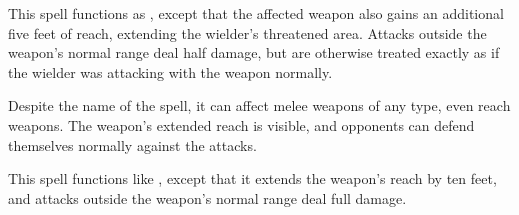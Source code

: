 \spelldur{\durshort}
\begin{spelleffect}
    This spell functions as , except that the affected weapon also gains an additional five feet of reach, extending the wielder's threatened area. Attacks outside the weapon's normal range deal half damage, but are otherwise treated exactly as if the wielder was attacking with the weapon normally.
\end{spelleffect}
\begin{spellnotes}
    Despite the name of the spell, it can affect melee weapons of any type, even reach weapons. The weapon's extended reach is visible, and opponents can defend themselves normally against the attacks.
\end{spellnotes}

\begin{spelleffect}
    This spell functions like , except that it extends the weapon's reach by ten feet, and attacks outside the weapon's normal range deal full damage.
\end{spelleffect}
